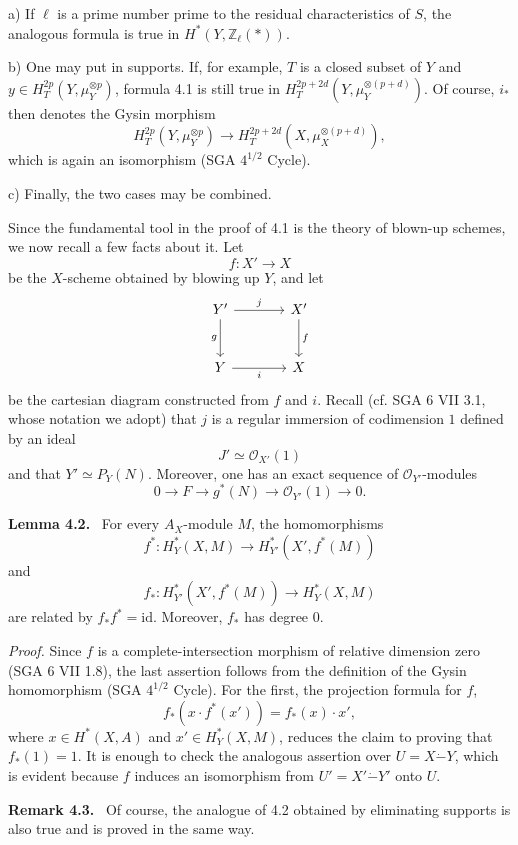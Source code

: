\documentclass[11pt]{article}
\newenvironment{statement}[1]{\par\medskip\noindent\textbf{#1.}\ }{\par\medskip}
\begin{document}
a) If $\ell$ is a prime number prime to the residual characteristics of $S$, the analogous formula is true in $H^*(Y,\mathbb Z_\ell(*))$.

b) One may put in supports. If, for example, $T$ is a closed subset of $Y$ and $y\in H_T^{2p}(Y,\mu_Y^{\otimes p})$, formula 4.1 is still true in $H_T^{2p+2d}(Y,\mu_Y^{\otimes(p+d)})$. Of course, $i_*$ then denotes the Gysin morphism
\[
H_T^{2p}(Y,\mu_Y^{\otimes p})
\to H_T^{2p+2d}(X,\mu_X^{\otimes(p+d)}),
\]
which is again an isomorphism (SGA $4^{1/2}$ Cycle).

c) Finally, the two cases may be combined.

Since the fundamental tool in the proof of 4.1 is the theory of blown-up schemes, we now recall a few facts about it. Let
\[
f:X'\to X
\]
be the $X$-scheme obtained by blowing up $Y$, and let
\[
\begin{tikzcd}[column sep=large,row sep=large]
Y' \arrow[r,"j"] \arrow[d,"g"'] & X' \arrow[d,"f"]\\
Y \arrow[r,"i"'] & X
\end{tikzcd}
\]
be the cartesian diagram constructed from $f$ and $i$. Recall (cf. SGA 6 VII 3.1, whose notation we adopt) that $j$ is a regular immersion of codimension $1$ defined by an ideal
\[
J'\simeq\mathcal O_{X'}(1)
\]
and that $Y'\simeq P_Y(N)$. Moreover, one has an exact sequence of $\mathcal O_{Y'}$-modules
\[
0\to F\to g^*(N)\to \mathcal O_{Y'}(1)\to0.
\]

\begin{statement}{Lemma 4.2}
For every $A_X$-module $M$, the homomorphisms
\[
f^*:H_Y^*(X,M)\to H_{Y'}^*(X',f^*(M))
\]
and
\[
f_*:H_{Y'}^*(X',f^*(M))\to H_Y^*(X,M)
\]
are related by $f_*f^*=\mathrm{id}$. Moreover, $f_*$ has degree $0$.
\end{statement}

\emph{Proof.} Since $f$ is a complete-intersection morphism of relative dimension zero (SGA 6 VII 1.8), the last assertion follows from the definition of the Gysin homomorphism (SGA $4^{1/2}$ Cycle). For the first, the projection formula for $f$,
\[
f_*(x\cdot f^*(x'))=f_*(x)\cdot x',
\]
where $x\in H^*(X,A)$ and $x'\in H_Y^*(X,M)$, reduces the claim to proving that $f_*(1)=1$. It is enough to check the analogous assertion over $U=X\mathbin{\dot{-}}Y$, which is evident because $f$ induces an isomorphism from $U'=X'\mathbin{\dot{-}}Y'$ onto $U$.

\begin{statement}{Remark 4.3}
Of course, the analogue of 4.2 obtained by eliminating supports is also true and is proved in the same way.
\end{statement}
\end{document}
